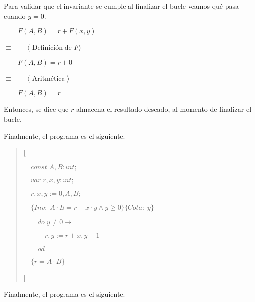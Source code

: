 \documentclass[hidelinks]{article}
\newenvironment{absolutelynopagebreak}
{\Needspace{10\baselineskip}\begin{quote}}
		{\end{quote}}
\begin{document}
\begin{enumerate}
	      Para validar que el invariante se cumple al finalizar el bucle veamos qué pasa
	      cuando $y = 0$.\par
	      $\qquad F(A,B) = r + F(x,y)$\par
	      $\equiv \qquad \langle $ Definición de $ F \rangle$\par
	      $\qquad F(A,B) = r + 0$\par
	      $\equiv \qquad \langle $ Aritmética $\rangle$\par
	      $\qquad F(A,B) = r$\par

	      Entonces, se dice que $r$ almacena el resultado deseado, al momento de
	      finalizar el bucle.\par

\end{enumerate}

Finalmente, el programa es el siguiente.\par

\begin{absolutelynopagebreak}
	[\par
		$\quad const \; A, B: int;$\par
		$\quad var \; r, x, y : int;$\par
		$\quad r, x, y := 0, A, B;$\par
		$\quad \{Inv:\; A \cdot B = r + x \cdot y \land y \geq 0\}\{Cota: \; y\}$ \par
		$\qquad do \; y \neq 0 \rightarrow$ \par
		$\qquad \quad r, y := r + x, y - 1$ \par
		$\qquad od$ \par
		$\quad \{r =A \cdot B\}$ \par
	]\par
\end{absolutelynopagebreak}\par

\newpage

Finalmente, el programa es el siguiente.\par
\end{document}
